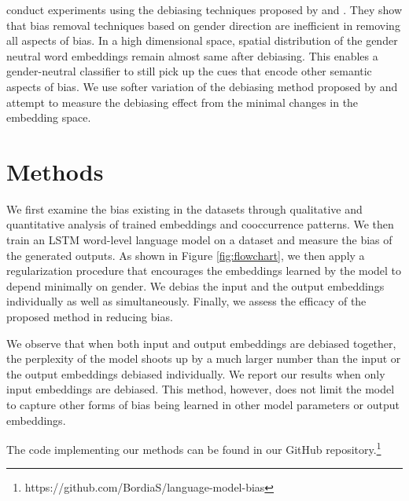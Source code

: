 \documentclass[11pt,a4paper]{article}
\begin{document}
 conduct experiments using the debiasing techniques proposed by \citet{bolukbasi2016man} and \citet{zhao2018b}. They show that bias removal techniques based on gender direction  are inefficient in removing all aspects of bias. In a high dimensional space, spatial distribution of the gender neutral word embeddings remain almost same after debiasing. This enables a gender-neutral classifier to still pick up the cues that encode other semantic aspects of bias. We use softer variation of the debiasing method proposed by \citet{bolukbasi2016man} and attempt to measure the debiasing effect from the minimal changes in the embedding space. 


\section{Methods}
We first examine the bias existing in the datasets through qualitative and quantitative analysis of trained embeddings and cooccurrence patterns. We then train an LSTM word-level language model on a dataset and measure the bias of the generated outputs. As shown in Figure \ref{fig:flowchart}, we then apply a regularization procedure that encourages the embeddings learned by the model to depend minimally on gender. We debias the input and the output embeddings individually as well as simultaneously.  %
Finally, we assess the efficacy of the proposed method in reducing bias. 

We observe that when both input and output embeddings are debiased together, the perplexity of the model shoots up by a much larger number than the input or the output embeddings debiased individually. We report our results when only input embeddings are debiased.  This method, however, does not limit the model to capture other forms of bias being learned in other model parameters or output embeddings. 

The code implementing our methods can be found in our GitHub repository.\footnote{https://github.com/BordiaS/language-model-bias}


    



% 
\end{document}
